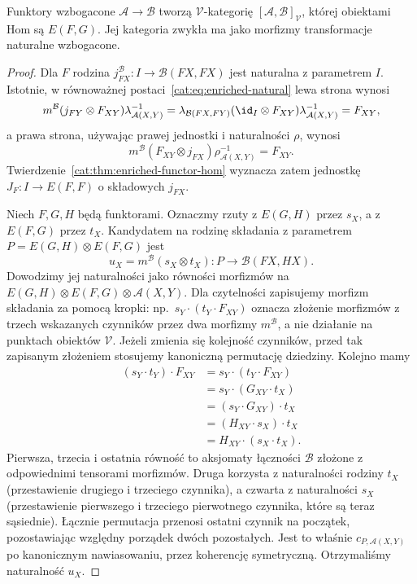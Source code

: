 \begin{twierdzenie}\label{cat:thm:enriched-functor-category}
Funktory wzbogacone $\mathcal A\to\mathcal B$ tworzą $\mathcal V$-kategorię $[\mathcal A,\mathcal B]_{\mathcal V}$, której obiektami Hom są $E(F,G)$. Jej kategoria zwykła ma jako morfizmy transformacje naturalne wzbogacone.
\end{twierdzenie}
\begin{proof}
Dla $F$ rodzina $j_{FX}^{\mathcal B}:I\to\mathcal B(FX,FX)$ jest naturalna z parametrem $I$. Istotnie, w równoważnej postaci~\eqref{cat:eq:enriched-natural} lewa strona wynosi
\[
 m^{\mathcal B}(j_{FY}\otimes F_{XY})\lambda_{\mathcal A(X,Y)}^{-1}
 =\lambda_{\mathcal B(FX,FY)}(\id_I\otimes F_{XY})
 \lambda_{\mathcal A(X,Y)}^{-1}=F_{XY},
\]
a prawa strona, używając prawej jednostki i naturalności $\rho$, wynosi
\[
 m^{\mathcal B}(F_{XY}\otimes j_{FX})\rho_{\mathcal A(X,Y)}^{-1}
 =F_{XY}.
\]
Twierdzenie~\ref{cat:thm:enriched-functor-hom} wyznacza zatem jednostkę $J_F:I\to E(F,F)$ o składowych $j_{FX}$.

Niech $F,G,H$ będą funktorami. Oznaczmy rzuty z $E(G,H)$ przez $s_X$, a z $E(F,G)$ przez $t_X$. Kandydatem na rodzinę składania z parametrem $P=E(G,H)\otimes E(F,G)$ jest
\[
 u_X=m^{\mathcal B}(s_X\otimes t_X):P\to\mathcal B(FX,HX).
\]
Dowodzimy jej naturalności jako równości morfizmów na
$E(G,H)\otimes E(F,G)\otimes\mathcal A(X,Y)$.
Dla czytelności zapisujemy morfizm składania za pomocą kropki: np.\ $s_Y\cdot(t_Y\cdot F_{XY})$ oznacza złożenie morfizmów z trzech wskazanych czynników przez dwa morfizmy $m^{\mathcal B}$, a nie działanie na punktach obiektów $\mathcal V$. Jeżeli zmienia się kolejność czynników, przed tak zapisanym złożeniem stosujemy kanoniczną permutację dziedziny. Kolejno mamy
\[
 \begin{aligned}
 (s_Y\cdot t_Y)\cdot F_{XY}
 &=s_Y\cdot(t_Y\cdot F_{XY})\\
 &=s_Y\cdot(G_{XY}\cdot t_X)\\
 &=(s_Y\cdot G_{XY})\cdot t_X\\
 &=(H_{XY}\cdot s_X)\cdot t_X\\
 &=H_{XY}\cdot(s_X\cdot t_X).
 \end{aligned}
\]
Pierwsza, trzecia i ostatnia równość to aksjomaty łączności $\mathcal B$ złożone z odpowiednimi tensorami morfizmów. Druga korzysta z naturalności rodziny $t_X$ (przestawienie drugiego i trzeciego czynnika), a czwarta z naturalności $s_X$ (przestawienie pierwszego i trzeciego pierwotnego czynnika, które są teraz sąsiednie). Łącznie permutacja przenosi ostatni czynnik na początek, pozostawiając względny porządek dwóch pozostałych. Jest to właśnie $c_{P,\mathcal A(X,Y)}$ po kanonicznym nawiasowaniu, przez koherencję symetryczną. Otrzymaliśmy naturalność $u_X$.


\end{proof}
